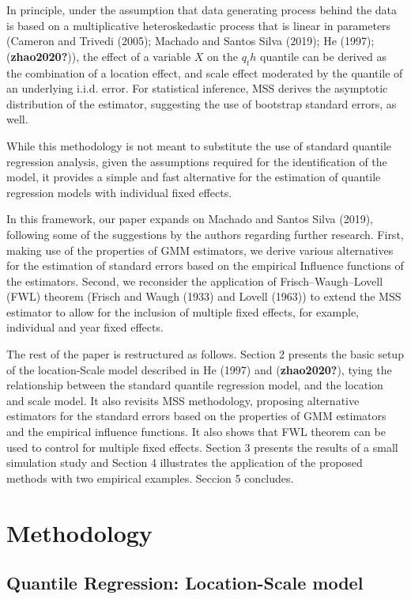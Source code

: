 \documentclass[
  letterpaper,
  DIV=11,
  numbers=noendperiod]{scrartcl}
\begin{document}
In principle, under the assumption that data generating process behind
the data is based on a multiplicative heteroskedastic process that is
linear in parameters (Cameron and Trivedi (2005); Machado and Santos
Silva (2019); He (1997); (\textbf{zhao2020?})), the effect of a variable
\(X\) on the \(q_th\) quantile can be derived as the combination of a
location effect, and scale effect moderated by the quantile of an
underlying i.i.d. error. For statistical inference, MSS derives the
asymptotic distribution of the estimator, suggesting the use of
bootstrap standard errors, as well.

While this methodology is not meant to substitute the use of standard
quantile regression analysis, given the assumptions required for the
identification of the model, it provides a simple and fast alternative
for the estimation of quantile regression models with individual fixed
effects.

In this framework, our paper expands on Machado and Santos Silva (2019),
following some of the suggestions by the authors regarding further
research. First, making use of the properties of GMM estimators, we
derive various alternatives for the estimation of standard errors based
on the empirical Influence functions of the estimators. Second, we
reconsider the application of Frisch--Waugh--Lovell (FWL) theorem
(Frisch and Waugh (1933) and Lovell (1963)) to extend the MSS estimator
to allow for the inclusion of multiple fixed effects, for example,
individual and year fixed effects.

The rest of the paper is restructured as follows. Section 2 presents the
basic setup of the location-Scale model described in He (1997) and
(\textbf{zhao2020?}), tying the relationship between the standard
quantile regression model, and the location and scale model. It also
revisits MSS methodology, proposing alternative estimators for the
standard errors based on the properties of GMM estimators and the
empirical influence functions. It also shows that FWL theorem can be
used to control for multiple fixed effects. Section 3 presents the
results of a small simulation study and Section 4 illustrates the
application of the proposed methods with two empirical examples. Seccion
5 concludes.

\hypertarget{methodology}{%
\section{Methodology}\label{methodology}}

\hypertarget{quantile-regression-location-scale-model}{%
\subsection{Quantile Regression: Location-Scale
model}\label{quantile-regression-location-scale-model}}
\end{document}
